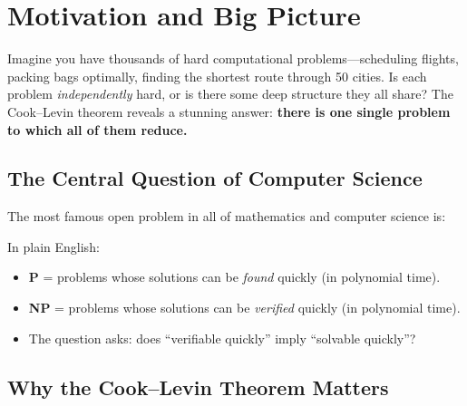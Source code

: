 \documentclass[12pt,a4paper]{article}
\newcommand{\P}{\mathbf{P}}
\newcommand{\NP}{\mathbf{NP}}
\begin{document}
\tableofcontents
\newpage

\section{Motivation and Big Picture}

\begin{intuition}
Imagine you have thousands of hard computational problems---scheduling flights, 
packing bags optimally, finding the shortest route through 50 cities. 
Is each problem \emph{independently} hard, or is there some deep structure 
they all share? The Cook--Levin theorem reveals a stunning answer:
\textbf{there is one single problem to which all of them reduce.}
\end{intuition}

\subsection{The Central Question of Computer Science}

The most famous open problem in all of mathematics and computer science is:

\begin{center}
\end{center}

\medskip
In plain English:
\begin{itemize}[leftmargin=2em]
  \item \textbf{P} = problems whose solutions can be \emph{found} quickly (in polynomial time).
  \item \textbf{NP} = problems whose solutions can be \emph{verified} quickly (in polynomial time).
  \item The question asks: does ``verifiable quickly'' imply ``solvable quickly''?
\end{itemize}

\subsection{Why the Cook--Levin Theorem Matters}
\end{document}

